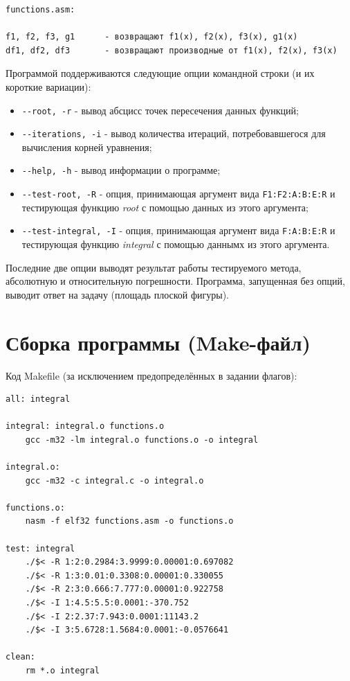\documentclass[a4paper,12pt,titlepage,finall]{article}
\begin{document}
\begin{verbatim}
functions.asm:

f1, f2, f3, g1      - возвращают f1(x), f2(x), f3(x), g1(x)
df1, df2, df3       - возвращают производные от f1(x), f2(x), f3(x)
\end{verbatim}
Программой поддерживаются следующие опции командной строки (и их короткие вариации):
\begin{itemize}
    \item \verb|--root, -r| - вывод абсцисс точек пересечения данных функций;
    \item \verb|--iterations, -i| - вывод количества итераций, потребовавшегося для вычисления корней уравнения;
    \item \verb|--help, -h| - вывод информации о программе;
    \item \verb|--test-root, -R| - опция, принимающая аргумент вида \verb|F1:F2:A:B:E:R| и тестирующая функцию \textit{root} с помощью данных из этого аргумента;
    \item \verb|--test-integral, -I| - опция, принимающая аргумент вида \verb|F:A:B:E:R| и тестирующая функцию \textit{integral} с помощью даннымх из этого аргумента.
\end{itemize}
Последние две опции выводят результат работы тестируемого метода, абсолютную и относительную погрешности. Программа, запущенная без опций, выводит ответ на задачу (площадь плоской фигуры).
\newpage
\section{Сборка программы (Make-файл)}
Код Makefile (за исключением предопределённых в задании флагов):

\begin{verbatim}
all: integral

integral: integral.o functions.o
	gcc -m32 -lm integral.o functions.o -o integral
	
integral.o: 
	gcc -m32 -c integral.c -o integral.o
	
functions.o: 
	nasm -f elf32 functions.asm -o functions.o

test: integral
	./$< -R 1:2:0.2984:3.9999:0.00001:0.697082
	./$< -R 1:3:0.01:0.3308:0.00001:0.330055
	./$< -R 2:3:0.666:7.777:0.00001:0.922758
	./$< -I 1:4.5:5.5:0.0001:-370.752
	./$< -I 2:2.37:7.943:0.0001:11143.2
	./$< -I 3:5.6728:1.5684:0.0001:-0.0576641

clean:
	rm *.o integral
\end{verbatim}
	
\end{document}
